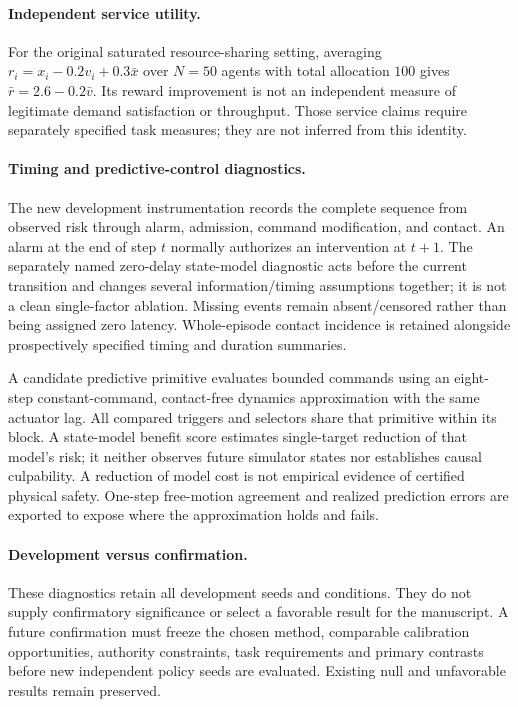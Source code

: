 \paragraph{Independent service utility.}
For the original saturated resource-sharing setting, averaging
$r_i=x_i-0.2v_i+0.3\bar x$ over $N=50$ agents with total allocation $100$ gives
$\bar r=2.6-0.2\bar v$. Its reward improvement is not an independent measure of
legitimate demand satisfaction or throughput. Those service claims require
separately specified task measures; they are not inferred from this identity.

\paragraph{Timing and predictive-control diagnostics.}
The new development instrumentation records the complete sequence from observed
risk through alarm, admission, command modification, and contact. An alarm at the
end of step $t$ normally authorizes an intervention at $t+1$. The separately named
zero-delay state-model diagnostic acts before the current transition and changes
several information/timing assumptions together; it is not a clean single-factor
ablation. Missing events remain absent/censored rather than being assigned zero
latency. Whole-episode contact incidence is retained alongside prospectively
specified timing and duration summaries.

A candidate predictive primitive evaluates bounded commands using an eight-step
constant-command, contact-free dynamics approximation with the same actuator lag.
All compared triggers and selectors share that primitive within its block. A
state-model benefit score estimates single-target reduction of that model's risk;
it neither observes future simulator states nor establishes causal culpability.
A reduction of model cost is not empirical evidence of certified physical safety.
One-step free-motion agreement and realized prediction errors are exported to expose
where the approximation holds and fails.

\paragraph{Development versus confirmation.}
These diagnostics retain all development seeds and conditions. They do not supply
confirmatory significance or select a favorable result for the manuscript. A future
confirmation must freeze the chosen method, comparable calibration opportunities,
authority constraints, task requirements and primary contrasts before new independent
policy seeds are evaluated. Existing null and unfavorable results remain preserved.
